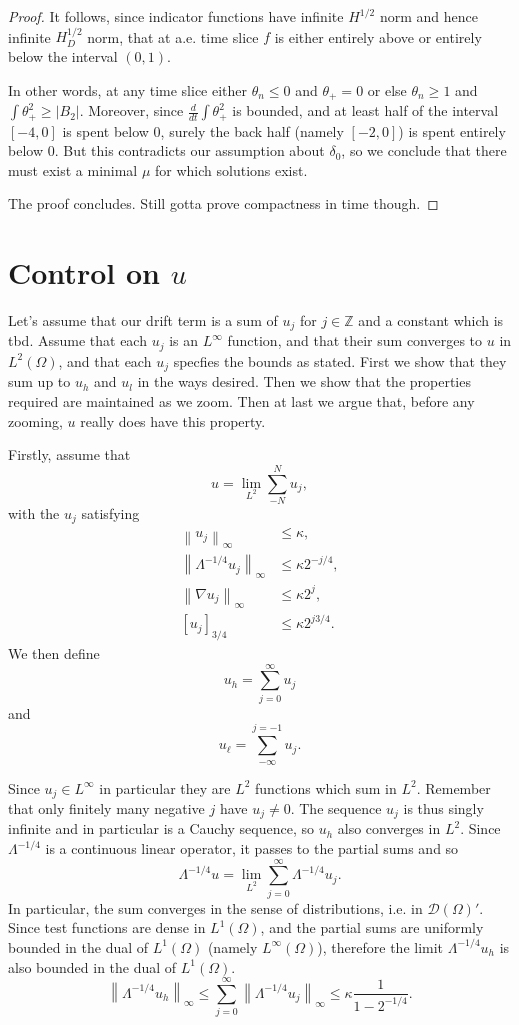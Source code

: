 \documentclass[11pt]{amsart}
\theoremstyle{remark}
\newcommand{\Z}{\mathbb{Z}}
\newcommand{\norm}[1]{\left\lVert#1\right\rVert}
\newcommand{\bracket}[1]{\left[ #1 \right]}
\newcommand{\grad}{\nabla}
\newcommand{\ddt}{\frac{d}{dt}}
\newcommand{\test}{\mathcal{D}}
\begin{document}
\begin{proof}
It follows, since indicator functions have infinite $H^{1/2}$ norm and hence infinite $H_D^{1/2}$ norm, that at a.e. time slice $f$ is either entirely above or entirely below the interval $(0,1)$.  

In other words, at any time slice either $\theta_n \leq 0$ and $\theta_+ = 0$ or else $\theta_n \geq 1$ and $\int \theta_+^2 \geq |B_2|$.  Moreover, since $\ddt \int \theta_+^2$ is bounded, and at least half of the interval $[-4,0]$ is spent below 0, surely the back half (namely $[-2,0]$) is spent entirely below 0.  But this contradicts our assumption about $\delta_0$, so we conclude that there must exist a minimal $\mu$ for which solutions exist.  

The proof concludes.  Still gotta prove compactness in time though.  

\end{proof}


\section{Control on $u$}
Let's assume that our drift term is a sum of $u_j$ for $j \in \Z$ and a constant which is tbd.  Assume that each $u_j$ is an $L^\infty$ function, and that their sum converges to $u$ in $L^2(\Omega)$, and that each $u_j$ specfies the bounds as stated.  First we show that they sum up to $u_h$ and $u_l$ in the ways desired.  Then we show that the properties required are maintained as we zoom.  Then at last we argue that, before any zooming, $u$ really does have this property.  

Firstly, assume that 
\[ u = \lim_{L^2} \sum_{-N}^N u_j, \]
with the $u_j$ satisfying
\begin{align*} 
\norm{u_j}_\infty &\leq \kappa, \\
\norm{\Lambda^{-1/4} u_j}_\infty &\leq \kappa 2^{-j/4}, \\
\norm{\grad u_j}_\infty &\leq \kappa 2^j, \\
\bracket{u_j}_{3/4} &\leq \kappa 2^{j 3/4}. 
\end{align*}
We then define
\[ u_h = \sum_{j=0}^\infty u_j \]
and 
\[ u_\ell = \sum_{-\infty}^{j=-1} u_j. \]

Since $u_j \in L^\infty$ in particular they are $L^2$ functions which sum in $L^2$.  Remember that only finitely many negative $j$ have $u_j \neq 0$.  The sequence $u_j$ is thus singly infinite and in particular is a Cauchy sequence, so $u_h$ also converges in $L^2$.  Since $\Lambda^{-1/4}$ is a continuous linear operator, it passes to the partial sums and so
\[ \Lambda^{-1/4} u = \lim_{L^2} \sum_{j=0}^\infty \Lambda^{-1/4} u_j. \]
In particular, the sum converges in the sense of distributions, i.e. in $\test(\Omega)'$.  Since test functions are dense in $L^1(\Omega)$, and the partial sums are uniformly bounded in the dual of $L^1(\Omega)$ (namely $L^\infty(\Omega)$), therefore the limit $\Lambda^{-1/4} u_h$ is also bounded in the dual of $L^1(\Omega)$.  
\[ \norm{\Lambda^{-1/4} u_h}_\infty \leq \sum_{j=0}^\infty \norm{\Lambda^{-1/4} u_j}_\infty \leq \kappa \frac{1}{1-2^{-1/4}}. \]
\end{document}
